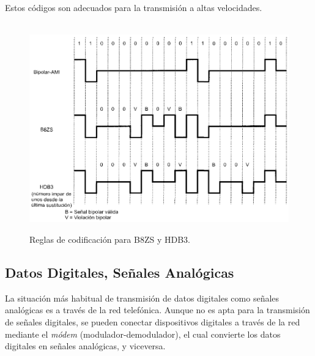 \documentclass[10pt,a4paper]{article}
\begin{document}
Estos códigos son adecuados para la transmisión a altas velocidades.

\begin{figure}[ht!]
  \caption{Reglas de codificación para B8ZS y HDB3.}
  \label{fig:b8zs_hdb3}  
  \centering
  \hbox{
	\includegraphics[width=\textwidth-\fboxrule-\fboxrule]{imgs/b8zs_hdb3.png}}
\end{figure}

\subsection{Datos Digitales, Señales Analógicas}

La situación más habitual de transmisión de datos digitales como señales analógicas es a través de la red telefónica. Aunque no es apta para la transmisión de señales digitales, se pueden conectar dispositivos digitales a través de la red mediante el \textit{módem} (modulador-demodulador), el cual convierte los datos digitales en señales analógicas, y viceversa.
\end{document}
